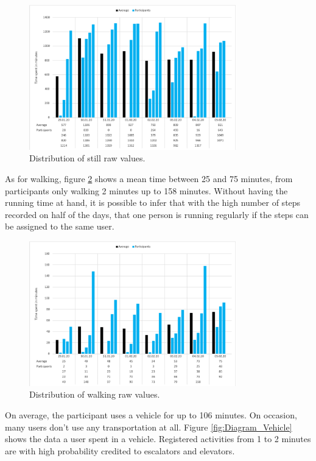 \begin{figure}[htpb]
  \centering
  \includegraphics[width=0.8\textwidth]{figures/Diagram_Still.png}
  \caption{Distribution of still raw values.} \label{fig:Diagram_Still}
\end{figure}

As for walking, figure \ref{fig:Diagram_Walking} shows a mean time between 25 and 75 minutes, from participants only walking 2 minutes up to 158 minutes. Without having the running time at hand, it is possible to infer that with the high number of steps recorded on half of the days, that one person is running regularly if the steps can be assigned to the same user.

\begin{figure}[htpb]
  \centering
  \includegraphics[width=0.8\textwidth]{figures/Diagram_Walking.png}
  \caption{Distribution of walking raw values.} \label{fig:Diagram_Walking}
\end{figure}

On average, the participant uses a vehicle for up to 106 minutes. On occasion, many users don't use any transportation at all. Figure \ref{fig:Diagram_Vehicle} shows the data a user spent in a vehicle. Registered activities from 1 to 2 minutes are with high probability credited to escalators and elevators.  

